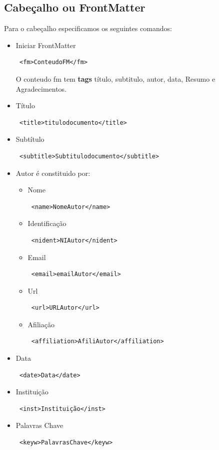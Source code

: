 \documentclass{report}
\begin{document}
\subsection{Cabeçalho ou FrontMatter}
Para o cabeçalho especificamos os seguintes comandos:
\begin{itemize}
\item Iniciar FrontMatter
\begin{verbatim} <fm>ConteudoFM</fm> \end{verbatim}
O conteudo fm tem \textbf{tags} título, subtitulo, autor, data, Resumo e Agradecimentos.
\item Título
\begin{verbatim} <title>titulodocumento</title> \end{verbatim} 
\item Subtítulo
\begin{verbatim} <subtitle>Subtitulodocumento</subtitle> \end{verbatim} 
\item Autor é constituido por:
\begin{itemize}
\item Nome
\begin{verbatim} <name>NomeAutor</name> \end{verbatim} 
\item Identificação
\begin{verbatim} <nident>NIAutor</nident> \end{verbatim} 
\item Email
\begin{verbatim} <email>emailAutor</email> \end{verbatim} 
\item Url
\begin{verbatim} <url>URLAutor</url> \end{verbatim} 
\item Afiliação
\begin{verbatim} <affiliation>AfiliAutor</affiliation> \end{verbatim}
\end{itemize}
\item Data
\begin{verbatim} <date>Data</date> \end{verbatim} 
\item Instituição
\begin{verbatim} <inst>Instituição</inst> \end{verbatim} 
\item Palavras Chave
\begin{verbatim} <keyw>PalavrasChave</keyw> \end{verbatim} 

\end{itemize}
\end{document}
